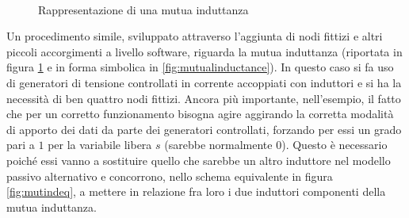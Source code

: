 \begin{figure}
 \centering
 \\\vspace{25pt}
 \caption{Rappresentazione di una mutua induttanza}
 \label{fig:mutind}
\end{figure}

Un procedimento simile, sviluppato attraverso l'aggiunta di nodi fittizi e altri piccoli accorgimenti a livello software, riguarda la mutua induttanza (riportata in figura \ref{fig:mutind} e in forma simbolica in \ref{fig:mutualinductance}). In questo caso si fa uso di generatori di tensione controllati in corrente accoppiati con induttori e si ha la necessità di ben quattro nodi fittizi. Ancora più importante, nell'esempio, il fatto che per un corretto funzionamento bisogna agire aggirando la corretta modalità di apporto dei dati da parte dei generatori controllati, forzando per essi un grado pari a $1$ per la variabile libera $s$ (sarebbe normalmente $0$). Questo è necessario poiché essi vanno a sostituire quello che sarebbe un altro induttore nel modello passivo alternativo e concorrono, nello schema equivalente in figura \ref{fig:mutindeq}, a mettere in relazione fra loro i due induttori componenti della mutua induttanza.

